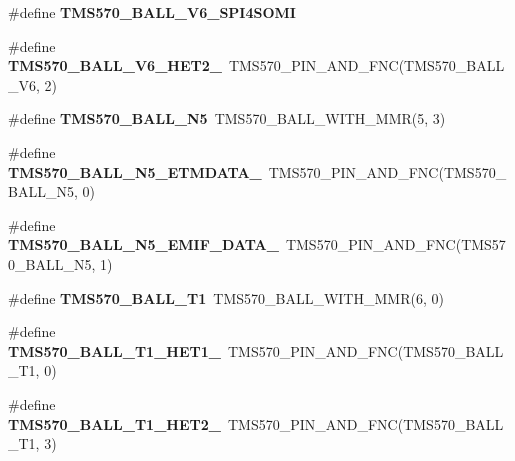 \begin{DoxyCompactItemize}
\item 
\#define {\bfseries T\+M\+S570\+\_\+\+B\+A\+L\+L\+\_\+\+V6\+\_\+\+S\+P\+I4\+S\+O\+MI}
\item 
\mbox{\label{tms570ls3137zwt-pins_8h_a7943d9cb28a4ef1a4e24a1e1b3561a69}} 
\#define {\bfseries T\+M\+S570\+\_\+\+B\+A\+L\+L\+\_\+\+V6\+\_\+\+H\+E\+T2\+\_}~T\+M\+S570\+\_\+\+P\+I\+N\+\_\+\+A\+N\+D\+\_\+\+F\+NC(T\+M\+S570\+\_\+\+B\+A\+L\+L\+\_\+\+V6, 2)
\item 
\mbox{\label{tms570ls3137zwt-pins_8h_aef47d7bf812397626967cacc81ea819a}} 
\#define {\bfseries T\+M\+S570\+\_\+\+B\+A\+L\+L\+\_\+\+N5}~T\+M\+S570\+\_\+\+B\+A\+L\+L\+\_\+\+W\+I\+T\+H\+\_\+\+M\+MR(5, 3)
\item 
\mbox{\label{tms570ls3137zwt-pins_8h_ac4bba4c53cd91fe10cf19ce8ab65b92d}} 
\#define {\bfseries T\+M\+S570\+\_\+\+B\+A\+L\+L\+\_\+\+N5\+\_\+\+E\+T\+M\+D\+A\+T\+A\+\_}~T\+M\+S570\+\_\+\+P\+I\+N\+\_\+\+A\+N\+D\+\_\+\+F\+NC(T\+M\+S570\+\_\+\+B\+A\+L\+L\+\_\+\+N5, 0)
\item 
\mbox{\label{tms570ls3137zwt-pins_8h_ac35eadee100f136168be1b7c68ff1c29}} 
\#define {\bfseries T\+M\+S570\+\_\+\+B\+A\+L\+L\+\_\+\+N5\+\_\+\+E\+M\+I\+F\+\_\+\+D\+A\+T\+A\+\_}~T\+M\+S570\+\_\+\+P\+I\+N\+\_\+\+A\+N\+D\+\_\+\+F\+NC(T\+M\+S570\+\_\+\+B\+A\+L\+L\+\_\+\+N5, 1)
\item 
\mbox{\label{tms570ls3137zwt-pins_8h_adad07deb9650001d6157a93c2853bc51}} 
\#define {\bfseries T\+M\+S570\+\_\+\+B\+A\+L\+L\+\_\+\+T1}~T\+M\+S570\+\_\+\+B\+A\+L\+L\+\_\+\+W\+I\+T\+H\+\_\+\+M\+MR(6, 0)
\item 
\mbox{\label{tms570ls3137zwt-pins_8h_aa23e309646fad1a636e8de59a1d4d4a1}} 
\#define {\bfseries T\+M\+S570\+\_\+\+B\+A\+L\+L\+\_\+\+T1\+\_\+\+H\+E\+T1\+\_}~T\+M\+S570\+\_\+\+P\+I\+N\+\_\+\+A\+N\+D\+\_\+\+F\+NC(T\+M\+S570\+\_\+\+B\+A\+L\+L\+\_\+\+T1, 0)
\item 
\mbox{\label{tms570ls3137zwt-pins_8h_ae553cd09a3442d893e7b384b0e44a586}} 
\#define {\bfseries T\+M\+S570\+\_\+\+B\+A\+L\+L\+\_\+\+T1\+\_\+\+H\+E\+T2\+\_}~T\+M\+S570\+\_\+\+P\+I\+N\+\_\+\+A\+N\+D\+\_\+\+F\+NC(T\+M\+S570\+\_\+\+B\+A\+L\+L\+\_\+\+T1, 3)

\end{DoxyCompactItemize}
